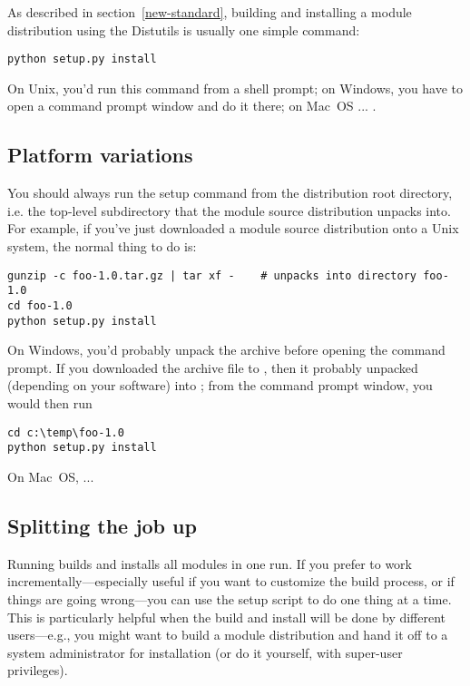 \documentclass{howto}
\begin{document}
As described in section~\ref{new-standard}, building and installing
a module distribution using the Distutils is usually one simple command:
\begin{verbatim}
python setup.py install
\end{verbatim}
On Unix, you'd run this command from a shell prompt; on Windows, you
have to open a command prompt window and do it there; on Mac~OS ...
.


\subsection{Platform variations}

You should always run the setup command from the distribution root
directory, i.e. the top-level subdirectory that the module source
distribution unpacks into.  For example, if you've just downloaded a
module source distribution  onto a Unix system, the
normal thing to do is:
\begin{verbatim}
gunzip -c foo-1.0.tar.gz | tar xf -    # unpacks into directory foo-1.0
cd foo-1.0
python setup.py install
\end{verbatim}

On Windows, you'd probably unpack the archive before opening the command
prompt.  If you downloaded the archive file to
, then it probably unpacked (depending on
your software) into
; from the command
prompt window, you would then run
\begin{verbatim}
cd c:\temp\foo-1.0
python setup.py install
\end{verbatim}

On Mac~OS, ... 


\subsection{Splitting the job up}

Running  builds and installs all modules in one
run.  If you prefer to work incrementally---especially useful if you
want to customize the build process, or if things are going wrong---you
can use the setup script to do one thing at a time.  This is
particularly helpful when the build and install will be done by
different users---e.g., you might want to build a module distribution
and hand it off to a system administrator for installation (or do it
yourself, with super-user privileges).
\end{document}
